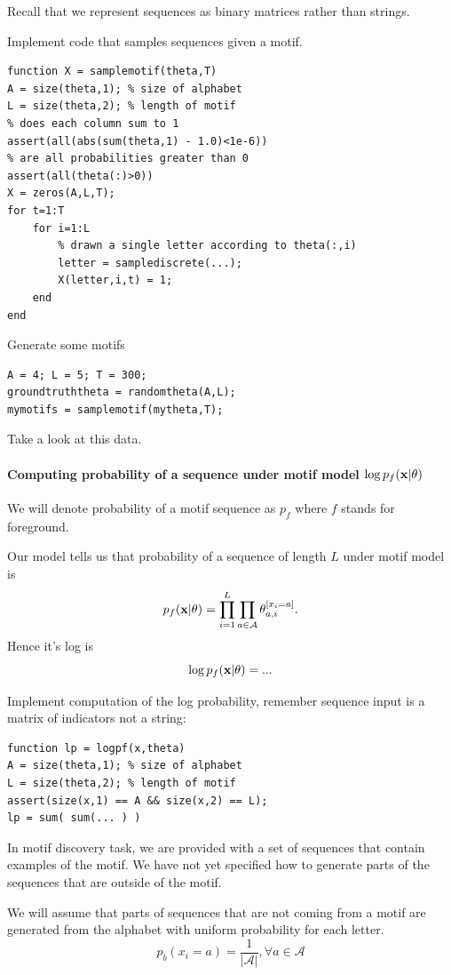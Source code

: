 \documentclass{article}
\begin{document}
{Recall that we represent sequences as binary matrices rather than strings.

Implement code that samples sequences given a motif.
\begin{verbatim}
function X = samplemotif(theta,T)
A = size(theta,1); % size of alphabet
L = size(theta,2); % length of motif
% does each column sum to 1
assert(all(abs(sum(theta,1) - 1.0)<1e-6))
% are all probabilities greater than 0
assert(all(theta(:)>0))
X = zeros(A,L,T);
for t=1:T
    for i=1:L
        % drawn a single letter according to theta(:,i)
        letter = samplediscrete(...);
        X(letter,i,t) = 1;
    end
end
\end{verbatim}

Generate some motifs

\begin{verbatim}
A = 4; L = 5; T = 300;
groundtruththeta = randomtheta(A,L);
mymotifs = samplemotif(mytheta,T);
\end{verbatim}

Take a look at this data.


\paragraph{Computing probability of a sequence under motif model $\log p_f(\mathbf{x}|\theta)$} 
We will denote probability of a motif sequence as $p_f$ where $f$ stands for foreground.

Our model tells us that probability of a sequence of length $L$ under motif model is 
\[
p_f(\mathbf{x}|\theta) = \prod_{i=1}^L\prod_{a \in \mathcal{A}} \theta_{a,i}^{[x_i = a]}.
\]
Hence it's log is
\[
\log p_f(\mathbf{x}|\theta) = ...
\]

Implement computation of the log probability, remember sequence input is a matrix of indicators not a string:
\begin{verbatim}
function lp = logpf(x,theta)
A = size(theta,1); % size of alphabet
L = size(theta,2); % length of motif
assert(size(x,1) == A && size(x,2) == L);
lp = sum( sum(... ) ) 
\end{verbatim}

\newproblem{2pt} In motif discovery task, we are provided with a set of sequences that contain
examples of the motif. We have not yet specified how to generate parts of the sequences that are 
outside of the motif. 

We will assume that parts of sequences that are not coming from a motif are generated from the alphabet
with uniform probability for each letter.
\[
p_b(x_i = a) = \frac{1}{|\mathcal{A}|}, \forall a \in \mathcal{A}
\]

}
\end{document}

